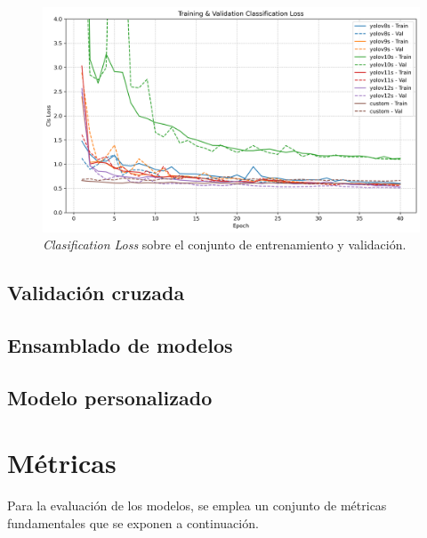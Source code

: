 \documentclass[12pt,a4paper,onecolumn,oneside]{report}
\begin{document}
\begin{figure}[htbp]
  \centering
  \includegraphics[width=1.0\textwidth]{figuras/yolo_plots/cls_loss.png}
  \caption{\textit{Clasification Loss} sobre el conjunto de entrenamiento y validación.}
  \label{fig:yolo_train_cls_loss}
\end{figure}

\subsection{Validación cruzada}
\subsection{Ensamblado de modelos}
\subsection{Modelo personalizado}

\section{Métricas}
\label{sec:Métricas}
Para la evaluación de los modelos, se emplea un conjunto de métricas fundamentales que se exponen a continuación.
\end{document}
